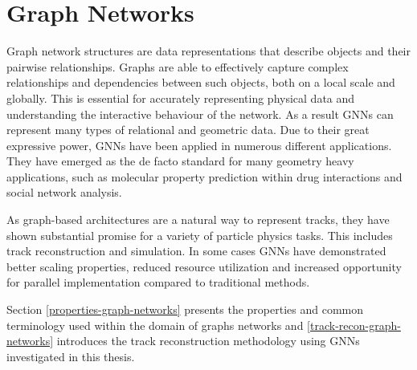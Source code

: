 


\section{Graph Networks}
\label{graph-networks}

Graph network structures are data representations that describe objects and their pairwise relationships. Graphs are able to effectively capture complex relationships and dependencies between such objects, both on a local scale and globally. This is essential for accurately representing physical data and understanding the interactive behaviour of the network. As a result GNNs can represent many types of relational and geometric data. Due to their great expressive power, GNNs have been applied in numerous different applications. They have emerged as the de facto standard for many geometry heavy applications, such as molecular property prediction within drug interactions and social network analysis.

As graph-based architectures are a natural way to represent tracks, they have shown substantial promise for a variety of particle physics tasks. This includes track reconstruction and simulation. In some cases GNNs have demonstrated better scaling properties, reduced resource utilization and increased opportunity for parallel implementation compared to traditional methods.

Section \ref{properties-graph-networks} presents the properties and common terminology used within the domain of graphs networks and \ref{track-recon-graph-networks} introduces the track reconstruction methodology using GNNs investigated in this thesis.



